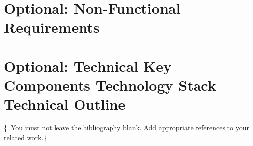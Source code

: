 \documentclass[conference,a4paper,flushend]{cs-techrep}
\begin{document}
\section{Optional: Non-Functional Requirements}
\lipsum[3]

\section{Optional: Technical Key Components \textbar{} Technology Stack \textbar{} Technical Outline}
\lipsum[4]

\{\,\faWarning{} You must not leave the bibliography blank. Add appropriate references to your related work.\}

\nocite{ModA-TR-2024SS-CCT-TeamGruen-CloudDice}
\nocite{ModA-TR-2024SS-BCN-TeamCyan-SkillIssue}
\nocite{ModA-TR-2024SS-BCN-TeamGelb-GoalGuru}
\nocite{ModA-TR-2024SS-BCN-TeamWeiss-InfluenzaConnect}
\nocite{ModA-TR-2024SS-BCN-TeamGruen-NanoVend}
\nocite{ModA-TR-2024SS-BCN-TeamRot-StockSentinel}
\nocite{ModA-TR-2024SS-WAE-TeamCyan-Connect4IfYouCan}
\nocite{ModA-TR-2024SS-WAE-TeamWeiss-Geodingens}
\nocite{ModA-TR-2024SS-WAE-TeamGruen-MunchMunch}
\nocite{ModA-TR-2023SS-WAE-TeamWeiss-Neunerln}
\nocite{ModA-TR-2023SS-BDCC-TeamRot-CompVisPipeline}
\nocite{ModA-TR-2023SS-BDCC-TeamBlau-NauticalNonsense}
\nocite{ModA-TR-2023SS-BCN-TeamGruen-TorpedoTactics}
\nocite{ModA-TR-2023SS-BCN-TeamCyan-Stockbird}
\nocite{ModA-TR-2023SS-BCN-TeamBlau-FancyChess}
\nocite{ModA-TR-2023WS-SWT-TeamRot-SGDb}
\nocite{ModA-TR-2023WS-SWT-TeamGruen-OPCUANetzwerk}
\nocite{ModA-TR-2022SS-WAE-TeamWeiss-WoIstMeinGeld}
\nocite{ModA-TR-2022SS-BDCC-TeamWeiss-TwitterDash}
\nocite{ModA-TR-2022SS-BDCC-TeamRot-Reddiment}
\nocite{ModA-TR-2022SS-BDCC-TeamGruen-ExplosionGuy}
\nocite{ModA-TR-2022SS-BDCC-TeamCyan-OTHWiki}
\nocite{ModA-TR-2022WS-SWT-TeamGruen-Graphvio}
\nocite{ModA-TR-2021SS-WAE-TeamWeiss-CovidDashboard}
\nocite{ModA-TR-2021SS-WAE-TeamRot-FireForceDefense}
\nocite{ModA-TR-2021SS-WAE-TeamGruen-MedPlanner}

\sloppy
\printbibliography[notcategory=selfref]
\end{document}
